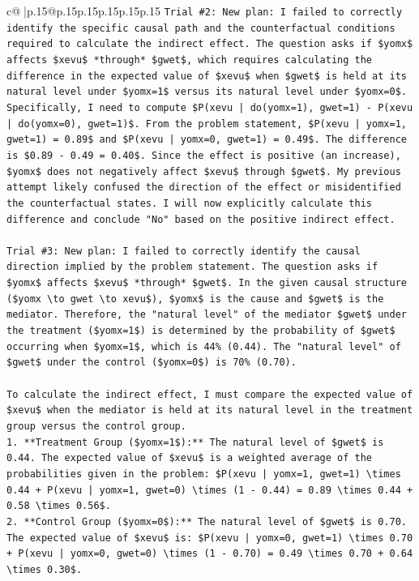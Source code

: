 \documentclass{article}
\begin{document}
{\begin{supertabular}{c@{$\;$}|p{.15\linewidth}@{}p{.15\linewidth}p{.15\linewidth}p{.15\linewidth}p{.15\linewidth}p{.15\linewidth}}
{{{\texttt{Trial \#2: New plan: I failed to correctly identify the specific causal path and the counterfactual conditions required to calculate the indirect effect. The question asks if \$yomx\$ affects \$xevu\$ *through* \$gwet\$, which requires calculating the difference in the expected value of \$xevu\$ when \$gwet\$ is held at its natural level under \$yomx=1\$ versus its natural level under \$yomx=0\$. Specifically, I need to compute \$P(xevu | do(yomx=1), gwet=1) {-} P(xevu | do(yomx=0), gwet=1)\$. From the problem statement, \$P(xevu | yomx=1, gwet=1) = 0.89\$ and \$P(xevu | yomx=0, gwet=1) = 0.49\$. The difference is \$0.89 {-} 0.49 = 0.40\$. Since the effect is positive (an increase), \$yomx\$ does not negatively affect \$xevu\$ through \$gwet\$. My previous attempt likely confused the direction of the effect or misidentified the counterfactual states. I will now explicitly calculate this difference and conclude "No" based on the positive indirect effect.} \\
\\ 
\texttt{Trial \#3: New plan: I failed to correctly identify the causal direction implied by the problem statement. The question asks if \$yomx\$ affects \$xevu\$ *through* \$gwet\$. In the given causal structure (\$yomx \textbackslash{}to gwet \textbackslash{}to xevu\$), \$yomx\$ is the cause and \$gwet\$ is the mediator. Therefore, the "natural level" of the mediator \$gwet\$ under the treatment (\$yomx=1\$) is determined by the probability of \$gwet\$ occurring when \$yomx=1\$, which is 44\% (0.44). The "natural level" of \$gwet\$ under the control (\$yomx=0\$) is 70\% (0.70).} \\
\\ 
\texttt{To calculate the indirect effect, I must compare the expected value of \$xevu\$ when the mediator is held at its natural level in the treatment group versus the control group.} \\
\texttt{1.  **Treatment Group (\$yomx=1\$):** The natural level of \$gwet\$ is 0.44. The expected value of \$xevu\$ is a weighted average of the probabilities given in the problem: \$P(xevu | yomx=1, gwet=1) \textbackslash{}times 0.44 + P(xevu | yomx=1, gwet=0) \textbackslash{}times (1 {-} 0.44) = 0.89 \textbackslash{}times 0.44 + 0.58 \textbackslash{}times 0.56\$.} \\
\texttt{2.  **Control Group (\$yomx=0\$):** The natural level of \$gwet\$ is 0.70. The expected value of \$xevu\$ is: \$P(xevu | yomx=0, gwet=1) \textbackslash{}times 0.70 + P(xevu | yomx=0, gwet=0) \textbackslash{}times (1 {-} 0.70) = 0.49 \textbackslash{}times 0.70 + 0.64 \textbackslash{}times 0.30\$.} \\
}}}
\end{supertabular}}
\end{document}
